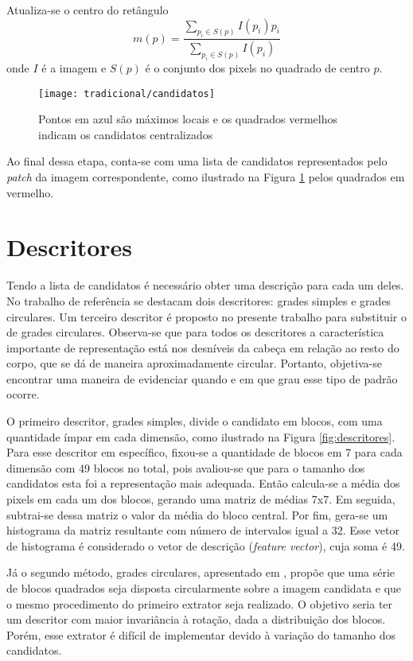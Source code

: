 Atualiza-se o centro do retângulo
\begin{equation}
	\label{eq:mean-shift}
	m(p) = \frac{\sum_{p_i \in S(p)} I(p_i)p_i}{\sum_{p_i \in S(p)} I(p_i)}
\end{equation}
onde $I$ é a imagem e $S(p)$ é o conjunto dos pixels no quadrado de centro $p$.

\begin{figure}[h]
\centering
\texttt{[image: tradicional/candidatos]}
\caption{Pontos em azul são máximos locais e os quadrados vermelhos indicam os candidatos centralizados}
\label{fig:candidatos}
\end{figure}

Ao final dessa etapa, conta-se com uma lista de candidatos representados pelo \textit{patch} da imagem correspondente, como ilustrado na Figura \ref{fig:candidatos} pelos quadrados em vermelho.

\section{Descritores}
\label{sec:tradicional-descritores}
Tendo a lista de candidatos é necessário obter uma descrição para cada um deles. No trabalho de referência \cite{rauter} se destacam dois descritores: grades simples e grades circulares. Um terceiro descritor é proposto no presente trabalho para substituir o de grades circulares. Observa-se que para todos os descritores a característica importante de representação está nos desníveis da cabeça em relação ao resto do corpo, que se dá de maneira aproximadamente circular. Portanto, objetiva-se encontrar uma maneira de evidenciar quando e em que grau esse tipo de padrão ocorre.

O primeiro descritor, grades simples, divide o candidato em blocos, com uma quantidade ímpar em cada dimensão, como ilustrado na Figura \ref{fig:descritores}. Para esse descritor em específico, fixou-se a quantidade de blocos em 7 para cada dimensão com 49 blocos no total, pois avaliou-se que para o tamanho dos candidatos esta foi a representação mais adequada. Então calcula-se a média dos pixels em cada um dos blocos, gerando uma matriz de médias 7x7. Em seguida, subtrai-se dessa matriz o valor da média do bloco central. Por fim, gera-se um histograma da matriz resultante com número de intervalos igual a 32. Esse vetor de histograma é considerado o vetor de descrição (\textit{feature vector}), cuja soma é 49.

Já o segundo método, grades circulares, apresentado em \cite{rauter}, propõe que uma série de blocos quadrados seja disposta circularmente sobre a imagem candidata e que o mesmo procedimento do primeiro extrator seja realizado. O objetivo seria ter um descritor com maior invariância à rotação, dada a distribuição dos blocos. Porém, esse extrator é difícil de implementar devido à variação do tamanho dos candidatos.

